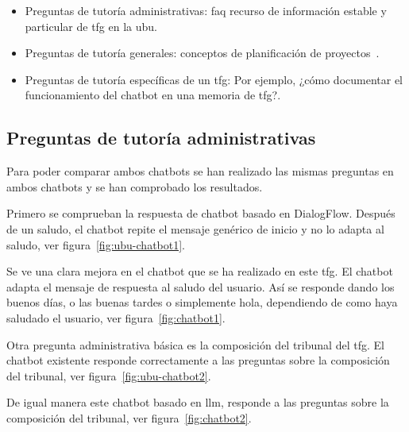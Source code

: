 \begin{itemize}

\item Preguntas de tutoría administrativas: \acrshort{faq} recurso de información estable y particular de \acrshort{tfg} en la \acrshort{ubu}.

\item Preguntas de tutoría generales: conceptos de planificación de proyectos~\cite{digit}.

\item Preguntas de tutoría específicas de un \acrshort{tfg}: Por ejemplo, ¿cómo documentar el funcionamiento del chatbot en una memoria de \acrshort{tfg}?.

\end{itemize}

\subsection{Preguntas de tutoría administrativas}

Para poder comparar ambos chatbots se han realizado las mismas preguntas en ambos chatbots y se han comprobado los resultados.

Primero se comprueban la respuesta de chatbot basado en DialogFlow. Después de un saludo, el chatbot repite el mensaje genérico de inicio y no lo adapta al saludo, ver figura~\ref{fig:ubu-chatbot1}.


Se ve una clara mejora en el chatbot que se ha realizado en este \acrshort{tfg}. El chatbot adapta el mensaje de respuesta al saludo del usuario. Así se responde dando los buenos días, o las buenas tardes o simplemente hola, dependiendo de como haya saludado el usuario, ver figura~\ref{fig:chatbot1}.


Otra pregunta administrativa básica es la composición del tribunal del \acrshort{tfg}. El chatbot existente responde correctamente a las preguntas sobre la composición del tribunal, ver figura~\ref{fig:ubu-chatbot2}.


De igual manera este chatbot basado en \acrshort{llm}, responde a las preguntas sobre la composición del tribunal, ver figura~\ref{fig:chatbot2}.

